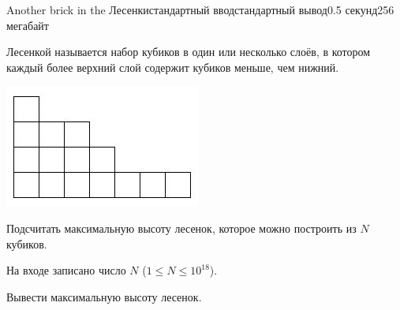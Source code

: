 \begin{problem}{Another brick in the Лесенки}{стандартный ввод}{стандартный вывод}{0.5 секунд}{256 мегабайт}

Лесенкой называется набор кубиков в один или несколько слоёв, в котором
каждый более верхний слой содержит кубиков меньше, чем нижний.

\includegraphics[scale=1,natwidth=243, natheight=152]{lesenki_image_ru_1.jpg}

Подсчитать максимальную высоту лесенок, которое можно построить из $N$ кубиков.

\InputFile
На входе записано число $N$ ($1 \le N \le 10^{18}$).

\OutputFile
Вывести максимальную высоту лесенок.

\Example

\begin{example}
%
\end{example}

\end{problem}

